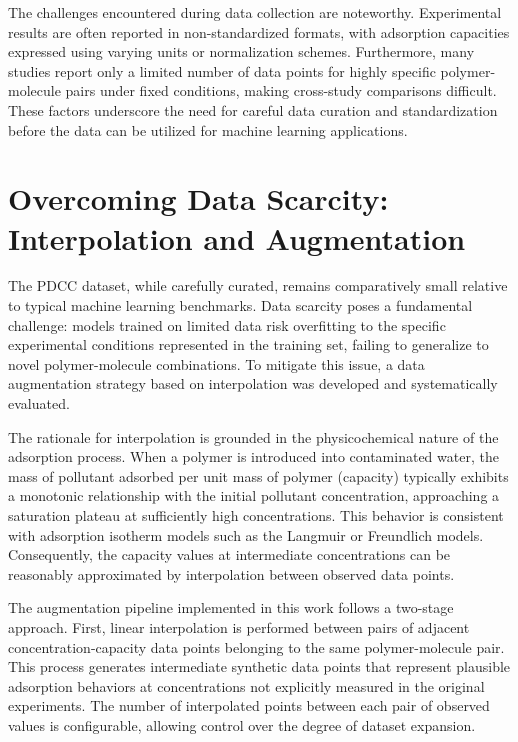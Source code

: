 The challenges encountered during data collection are noteworthy. Experimental results are often reported in non-standardized formats, with adsorption capacities expressed using varying units or normalization schemes. Furthermore, many studies report only a limited number of data points for highly specific polymer-molecule pairs under fixed conditions, making cross-study comparisons difficult. These factors underscore the need for careful data curation and standardization before the data can be utilized for machine learning applications.

\section{Overcoming Data Scarcity: Interpolation and Augmentation}
\label{sec:data_augmentation}

The PDCC dataset, while carefully curated, remains comparatively small relative to typical machine learning benchmarks. Data scarcity poses a fundamental challenge: models trained on limited data risk overfitting to the specific experimental conditions represented in the training set, failing to generalize to novel polymer-molecule combinations. To mitigate this issue, a data augmentation strategy based on interpolation was developed and systematically evaluated.

The rationale for interpolation is grounded in the physicochemical nature of the adsorption process. When a polymer is introduced into contaminated water, the mass of pollutant adsorbed per unit mass of polymer (capacity) typically exhibits a monotonic relationship with the initial pollutant concentration, approaching a saturation plateau at sufficiently high concentrations. This behavior is consistent with adsorption isotherm models such as the Langmuir or Freundlich models. Consequently, the capacity values at intermediate concentrations can be reasonably approximated by interpolation between observed data points.

The augmentation pipeline implemented in this work follows a two-stage approach. First, linear interpolation is performed between pairs of adjacent concentration-capacity data points belonging to the same polymer-molecule pair. This process generates intermediate synthetic data points that represent plausible adsorption behaviors at concentrations not explicitly measured in the original experiments. The number of interpolated points between each pair of observed values is configurable, allowing control over the degree of dataset expansion.

